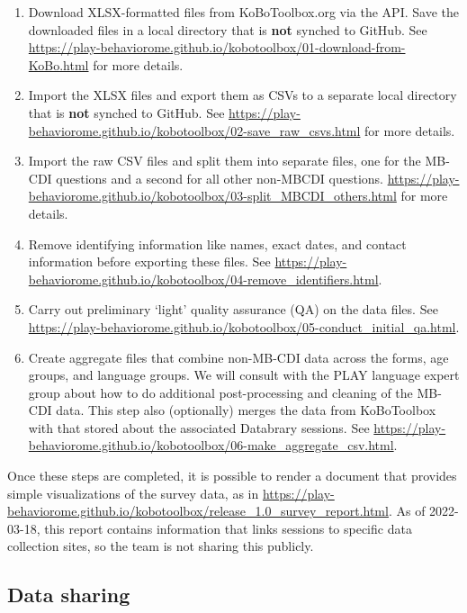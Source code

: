 \documentclass[
  12pt,
]{book}
\begin{document}
\begin{enumerate}
\def\labelenumi{\arabic{enumi}.}
\item
  Download XLSX-formatted files from KoBoToolbox.org via the API. Save the downloaded files in a local directory that is \textbf{not} synched to GitHub. See \url{https://play-behaviorome.github.io/kobotoolbox/01-download-from-KoBo.html} for more details.
\item
  Import the XLSX files and export them as CSVs to a separate local directory that is \textbf{not} synched to GitHub. See \url{https://play-behaviorome.github.io/kobotoolbox/02-save_raw_csvs.html} for more details.
\item
  Import the raw CSV files and split them into separate files, one for the MB-CDI questions and a second for all other non-MBCDI questions. \url{https://play-behaviorome.github.io/kobotoolbox/03-split_MBCDI_others.html} for more details.
\item
  Remove identifying information like names, exact dates, and contact information before exporting these files. See \url{https://play-behaviorome.github.io/kobotoolbox/04-remove_identifiers.html}.
\item
  Carry out preliminary `light' quality assurance (QA) on the data files. See \url{https://play-behaviorome.github.io/kobotoolbox/05-conduct_initial_qa.html}.
\item
  Create aggregate files that combine non-MB-CDI data across the forms, age groups, and language groups. We will consult with the PLAY language expert group about how to do additional post-processing and cleaning of the MB-CDI data. This step also (optionally) merges the data from KoBoToolbox with that stored about the associated Databrary sessions. See \url{https://play-behaviorome.github.io/kobotoolbox/06-make_aggregate_csv.html}.
\end{enumerate}

Once these steps are completed, it is possible to render a document that provides simple visualizations of the survey data, as in \url{https://play-behaviorome.github.io/kobotoolbox/release_1.0_survey_report.html}. As of 2022-03-18, this report contains information that links sessions to specific data collection sites, so the team is not sharing this publicly.

\hypertarget{data-sharing}{%
\subsection{Data sharing}\label{data-sharing}}
\end{document}
